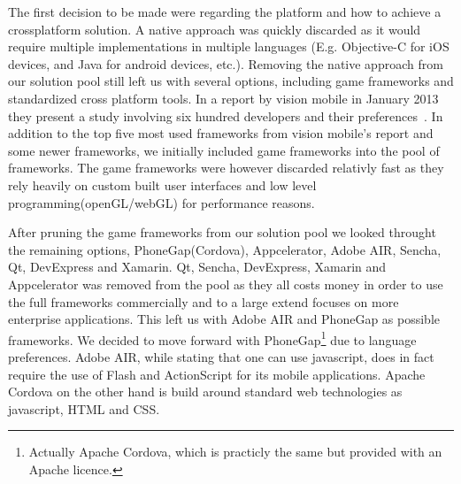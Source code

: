 	\bigskip\noindent
	The first decision to be made were regarding the platform and how to achieve a crossplatform solution. 
	A native approach was quickly discarded as it would require multiple implementations in multiple languages (E.g. Objective-C for iOS devices, and Java for android devices, etc.). 
	Removing the native approach from our solution pool still left us with several options, including game frameworks and standardized cross platform tools.
	In a report by vision mobile in January 2013 they present a study involving six hundred developers and their preferences~\cite{developerCPT}. 
	In addition to the top five most used frameworks from vision mobile's report and some newer frameworks, we initially included game frameworks into the pool of frameworks. 
	The game frameworks were however discarded relativly fast as they rely heavily on custom built user interfaces and low level programming(openGL/webGL) for performance reasons.
	
	\bigskip\noindent
	After pruning the game frameworks from our solution pool we looked throught the remaining options, PhoneGap(Cordova), Appcelerator, Adobe AIR, Sencha, Qt, DevExpress and Xamarin.
	Qt, Sencha, DevExpress, Xamarin and Appcelerator was removed from the pool as they all costs money in order to use the full frameworks commercially and to a large extend focuses on more enterprise applications.
	This left us with Adobe AIR and PhoneGap as possible frameworks. 
	We decided to move forward with PhoneGap\footnote{Actually Apache Cordova, which is practicly the same but provided with an Apache licence.}
	due to language preferences. Adobe AIR, while stating that one can use javascript, does in fact require the use of Flash and ActionScript for its mobile applications.
	Apache Cordova on the other hand is build around standard web technologies as javascript, HTML and CSS.
	
	
	
	
	
	
	
	